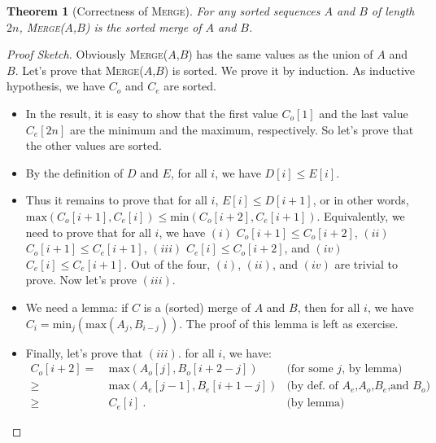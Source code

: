 \documentclass[11pt,a4paper,oneside,microtype,chapter,nokorean]{oblivoir}
\newtheorem{theorem}{Theorem}
\begin{document}
\begin{theorem}[Correctness of \textsc{Merge}] For any sorted sequences $A$ and $B$ of length $2n$,
  \textsc{Merge}($A$,$B$) is the sorted merge of $A$ and $B$.
\end{theorem}
\begin{proof}[Proof Sketch]
  Obviously \textsc{Merge}($A$,$B$) has the same values as the union of $A$ and $B$.  Let's prove
  that \textsc{Merge}($A$,$B$) is sorted.  We prove it by induction.  As inductive hypothesis, we
  have $C_o$ and $C_e$ are sorted.

  \begin{itemize}
  \item In the result, it is easy to show that the first value $C_o[1]$ and the last value $C_e[2n]$
    are the minimum and the maximum, respectively.  So let's prove that the other values are sorted.

  \item By the definition of $D$ and $E$, for all $i$, we have $D[i] \le E[i]$.

  \item Thus it remains to prove that for all $i$, $E[i] \le D[i+1]$, or in other words,
    $\textrm{max}(C_o[i+1],C_e[i]) \le \textrm{min}(C_o[i+2],C_e[i+1])$.  Equivalently, we need to
    prove that for all $i$, we have $(i)$ $C_o[i+1] \le C_o[i+2]$, $(ii)$ $C_o[i+1] \le C_e[i+1]$,
    $(iii)$ $C_e[i] \le C_o[i+2]$, and $(iv)$ $C_e[i] \le C_e[i+1]$.  Out of the four, $(i)$,
    $(ii)$, and $(iv)$ are trivial to prove.  Now let's prove $(iii)$.

  \item We need a lemma: if $C$ is a (sorted) merge of $A$ and $B$, then for all $i$, we have
    $C_i = \textrm{min}_j (\textrm{max}(A_j,B_{i-j}))$.  The proof of this lemma is left as
    exercise.

  \item Finally, let's prove that $(iii)$.  for all $i$, we have:
    \begin{align*}
      C_o[i+2]
      =&~ \textrm{max}(A_o[j], B_o[i+2-j]) & \mbox{(for some $j$, by lemma)} \\
      \ge&~ \textrm{max}(A_e[j-1], B_e[i+1-j]) & \mbox{(by def. of $A_e$,$A_o$,$B_e$,and $B_o$)} \\
      \ge&~ C_e[i]~. & \mbox{(by lemma)}
    \end{align*}
  \end{itemize}
\end{proof}
\end{document}
